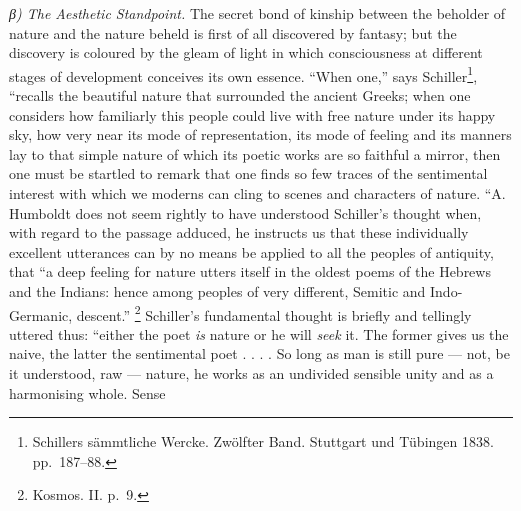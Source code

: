 \documentclass[12pt,a4paper]{book}
\renewcommand{\thefootnote}{*)}
\newcommand{\subrunin}[1]{\emph{#1}\hspace{0.4em}}
\begin{document}
\subrunin{β) The Aesthetic Standpoint.} The secret bond of kinship between the beholder of nature and the nature beheld
is first of all discovered by fantasy; but the discovery is coloured by the gleam of light in which consciousness at
different stages of development conceives its own essence.
``When one,'' says Schiller\footnote{%
Schillers sämmtliche Wercke. Zwölfter Band. Stuttgart und Tübingen 1838. pp.\ 187--88.}, ``recalls the beautiful nature
that surrounded the ancient Greeks; when one considers how familiarly this people could live with free nature under its
happy sky, how very near its mode of representation, its mode of feeling and its manners lay to that simple nature of
which its poetic works are so faithful a mirror, then one must be startled to remark that one finds so few traces of the
sentimental interest with which we moderns can cling to scenes and characters of nature. ``A. Humboldt does not seem
rightly to have understood Schiller's thought when, with regard to the passage adduced, he instructs us that these
individually excellent utterances can by no means be applied to all the peoples of antiquity, that ``a deep feeling for
nature utters itself in the oldest poems of the Hebrews and the Indians: hence among peoples of very different, Semitic
and Indo-Germanic, descent.''%
\renewcommand{\thefootnote}{**)}%
\footnote{%
Kosmos. II. p.\ 9.}%
\renewcommand{\thefootnote}{*)}
Schiller's fundamental thought is briefly and tellingly uttered thus: ``either the poet \emph{is} nature or he will
\emph{seek} it. The former gives us the naive, the latter the sentimental poet . . . . So long as man is still pure ---
not, be it understood, raw --- nature, he works as an undivided sensible unity and as a harmonising whole. Sense
\end{document}
